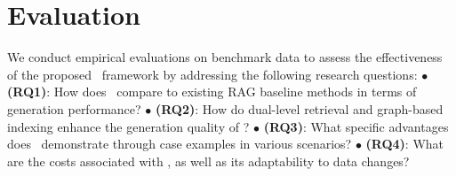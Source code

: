 \section{Evaluation}
\label{sec:eval}
We conduct empirical evaluations on benchmark data to assess the effectiveness of the proposed \model\ framework by addressing the following research questions: $\bullet$ \textbf{(RQ1)}: How does \model\ compare to existing RAG baseline methods in terms of generation performance? $\bullet$ \textbf{(RQ2)}: How do dual-level retrieval and graph-based indexing enhance the generation quality of \model? $\bullet$ \textbf{(RQ3)}: What specific advantages does \model\ demonstrate through case examples in various scenarios? $\bullet$ \textbf{(RQ4)}: What are the costs associated with \model, as well as its adaptability to data changes?

